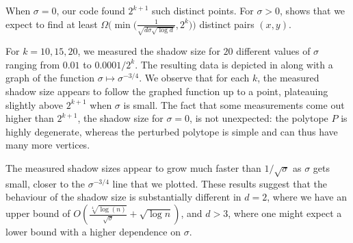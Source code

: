 \documentclass{article}\usepackage[a4paper,margin=20mm]{geometry}
\begin{document}
When $\sigma = 0$, our code found $2^{k+1}$ such distinct points.
For $\sigma > 0$,  shows that we expect to find at least
$\Omega \Big(\min \Big(\frac{1}{\sqrt{d\sigma\sqrt{\log d}}},2^k \Big) \Big)$ distinct pairs $(x,y)$.


For $k = 10,15,20$, we measured the shadow size for $20$ different values of $\sigma$ ranging from $0.01$ to $0.0001/2^k$.
The resulting data is depicted in  along with a graph of the function $\sigma \mapsto \sigma^{-3/4}$.
We observe that for each $k$, the measured shadow size appears to follow the graphed function up to a point,
plateauing slightly above $2^{k+1}$ when $\sigma$ is small.
The fact that some measurements come out higher than $2^{k+1}$, the shadow size for $\sigma = 0$, is not unexpected:
the polytope $P$ is highly degenerate, whereas the perturbed polytope is simple and can thus have many more vertices.



The measured shadow sizes appear to grow much faster than $1/\sqrt\sigma$ as $\sigma$ gets small, closer to the $\sigma^{-3/4}$ line that we plotted.
These results suggest that the behaviour of the shadow size is
substantially different in $d = 2$, where
we have an upper bound of
$O\left(\frac{\sqrt[4]{\log(n)}}{\sqrt\sigma} + \sqrt{\log n}\right)$,
and $d > 3$, where one might expect a lower bound with a higher dependence on $\sigma$.



 
% 
% 


\end{document}
